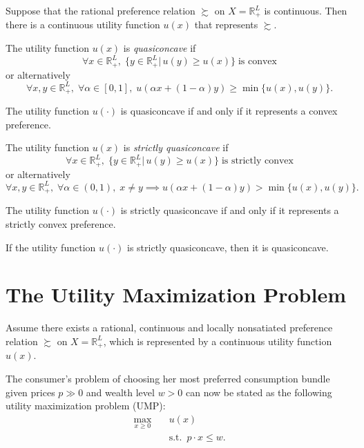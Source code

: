 \documentclass[12pt,fleqn]{book} %
\begin{document}
\begin{theorem}
	Suppose that the rational preference relation $\succsim$ on $X=\mathbb{R}_+^L$ is continuous.
	Then there is a continuous utility function $u(x)$ that represents $\succsim$.
\end{theorem}

\begin{definition}[Quasiconcavity]
	The utility function $u(x)$ is \emph{quasiconcave} if
	\[
	\forall x\in\mathbb{R}_+^L,\;\{y\in\mathbb{R}_+^L|\,u(y)\geqslant u(x)\}\;\text{is convex}
	\]
	or alternatively
	\[
	\forall x,y\in\mathbb{R}_+^L,\;\forall \alpha\in[0,1],\;u(\alpha x+(1-\alpha)y)\geqslant \min\{u(x),u(y)\}.
	\]
\end{definition}

\begin{proposition}
	The utility function $u(\cdot)$ is quasiconcave if and only if it represents a convex preference.
\end{proposition}


\begin{definition}
	The utility function $u(x)$ is \emph{strictly quasiconcave} if
	\[
	\forall x\in\mathbb{R}_+^L,\;\{y\in\mathbb{R}_+^L|\,u(y)\geqslant u(x)\}\;\text{is strictly convex}
	\]
	or alternatively
	\[
	\forall x,y\in\mathbb{R}_+^L,\;\forall \alpha\in(0,1),\;x\ne y\implies u(\alpha x+(1-\alpha)y)>\min\{u(x),u(y)\}.
	\]
\end{definition}

\begin{proposition}
	The utility function $u(\cdot)$ is strictly quasiconcave if and only if it represents a strictly convex preference.
\end{proposition}

\begin{proposition}
	If the utility function $u(\cdot)$ is strictly quasiconcave, then it is quasiconcave.
\end{proposition}


\section{The Utility Maximization Problem}

Assume there exists a rational, continuous and locally nonsatiated preference relation $\succsim$ on $X=\mathbb{R}_+^L$, which is represented by a continuous utility function $u(x)$. 

The consumer's problem of choosing her most preferred consumption bundle
given prices $p\gg 0$ and wealth level $w > 0$ can now be stated as the following utility maximization problem (UMP):
\begin{align*}
	\max_{x\ge 0} \quad & u(x) \\
	                    & \mathrm{s.t.}\ \; p\cdot x\le w.
\end{align*}
\end{document}
